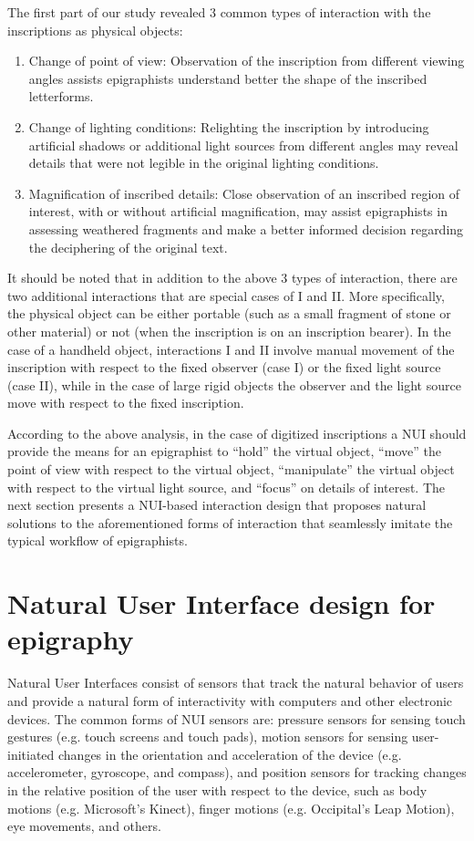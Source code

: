 \documentclass[amsthm,ebook]{saparticle}
\begin{document}
The first part of our study revealed 3 common types of interaction with the inscriptions as physical objects:
\newpage
\begin{enumerate}
\item Change of point of view: Observation of the inscription from different viewing angles assists epigraphists
understand better the shape of the inscribed letterforms. 
\item Change of lighting conditions: Relighting the inscription by introducing artificial shadows or additional light
sources from different angles may reveal details that were not legible in the original lighting conditions.
\item Magnification of inscribed details: Close observation of an inscribed region of interest, with or without
artificial magnification, may assist epigraphists in assessing weathered fragments and make a better informed decision
regarding the deciphering of the original text.
\end{enumerate}
It should be noted that in addition to the above 3 types of interaction, there are two additional interactions that are
special cases of I and II. More specifically, the physical object can be either portable (such as a small fragment of
stone or other material) or not (when the inscription is on an inscription bearer). In the case of a handheld object,
interactions I and II involve manual movement of the inscription with respect to the fixed observer (case I) or the
fixed light source (case II), while in the case of large rigid objects the observer and the light source move with
respect to the fixed inscription. 

According to the above analysis, in the case of digitized inscriptions a NUI should provide the means for an epigraphist
to ``hold'' the virtual object, ``move'' the point of view with
respect to the virtual object, ``manipulate'' the virtual object with respect to the virtual
light source, and ``focus'' on details of interest. The next section presents a NUI-based
interaction design that proposes natural solutions to the aforementioned forms of interaction that seamlessly imitate
the typical workflow of epigraphists. 

\section{Natural User Interface design for epigraphy}


\noindent Natural User Interfaces consist of sensors that track the natural behavior of users and provide a natural form of
interactivity with computers and other electronic devices. The common forms of NUI sensors are: pressure sensors for
sensing touch gestures (e.g. touch screens and touch pads), motion sensors for sensing user-initiated changes in the
orientation and acceleration of the device (e.g. accelerometer, gyroscope, and compass), and position sensors for
tracking changes in the relative position of the user with respect to the device, such as body motions (e.g.
Microsoft's Kinect), finger motions (e.g. Occipital's Leap Motion), eye movements, and others.
\end{document}
